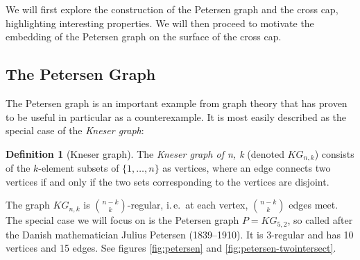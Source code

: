 \documentclass[11pt,            %
               a4paper,         %
               oneside,         %
               DIV12,           %
               fleqn,           %
               halfparskip,     %
               nochapterprefix, %
              ]{scrartcl} %
\theoremstyle{definition}
\newtheorem{definition}{Definition}
\begin{document}
We will first explore the construction of the Petersen graph and the
cross cap, highlighting interesting properties. We will then proceed
to motivate the embedding of the Petersen graph on the surface of the
cross cap.

\subsection{The Petersen Graph}

The Petersen graph is an important example from graph theory that has
proven to be useful in particular as a counterexample. It is most
easily described as the special case of the \emph{Kneser graph}:

\begin{definition}[Kneser graph]
  The \emph{Kneser graph of n, k} (denoted $KG_{n,k}$) consists of
  the $k$-element subsets of $\{1,\ldots,n\}$ as vertices, where an
  edge connects two vertices if and only if the two sets corresponding
  to the vertices are disjoint.
\end{definition}

The graph $KG_{n,k}$ is ${n-k}\choose k$-regular, i.\,e.~at each
vertex, ${n-k}\choose k$ edges meet.
The special case we will focus on is the
Petersen graph $P = KG_{5,2}$, so called after the Danish
mathematician Julius Petersen (1839--1910). It is 3-regular and has 10
vertices and 15 edges. See figures
\ref{fig:petersen} and \ref{fig:petersen-twointersect}.
\end{document}

